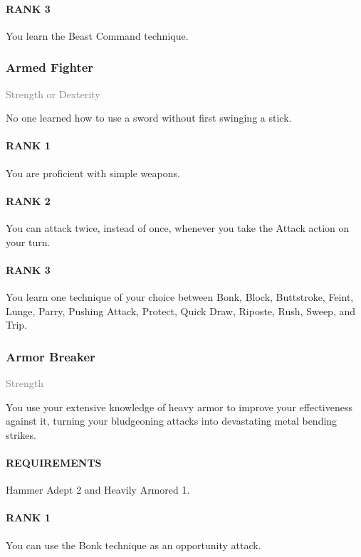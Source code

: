 \paragraph{RANK 3} You learn the Beast Command technique.

\subsubsection{Armed Fighter} \label{feat::armedfighter}
\small{\textcolor{gray}{Strength or Dexterity}}

\normalsize
No one learned how to use a sword without first swinging a stick.
\paragraph{RANK 1} You are proficient with simple weapons.
\paragraph{RANK 2} You can attack twice, instead of once, whenever you take the Attack action on your turn.
\paragraph{RANK 3} You learn one technique of your choice between Bonk, Block, Buttstroke, Feint, Lunge, Parry, Pushing Attack, Protect, Quick Draw, Riposte, Rush, Sweep, and Trip.

\subsubsection{Armor Breaker} \label{feat::armorbreaker}
\small{\textcolor{gray}{Strength}}

\normalsize
You use your extensive knowledge of heavy armor to improve your effectiveness against it, turning your bludgeoning attacks into devastating metal bending strikes.
\paragraph{REQUIREMENTS} Hammer Adept 2 and Heavily Armored 1.
\paragraph{RANK 1} You can use the Bonk technique as an opportunity attack.
